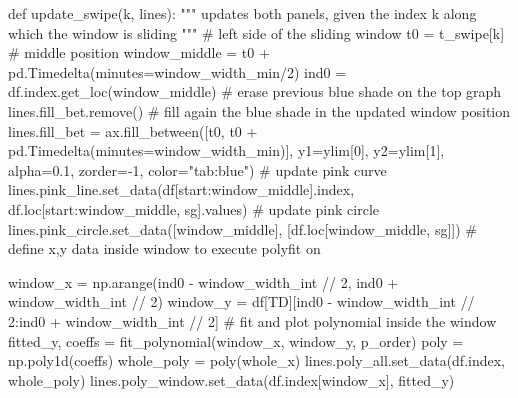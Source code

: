 \documentclass[
  letterpaper,
  DIV=11,
  numbers=noendperiod,
  oneside]{scrreprt}
\newenvironment{Shaded}{\begin{snugshade}}{\end{snugshade}}
\newcommand{\CommentTok}[1]{\textcolor[rgb]{0.37,0.37,0.37}{#1}}
\newcommand{\DecValTok}[1]{\textcolor[rgb]{0.68,0.00,0.00}{#1}}
\newcommand{\FloatTok}[1]{\textcolor[rgb]{0.68,0.00,0.00}{#1}}
\newcommand{\KeywordTok}[1]{\textcolor[rgb]{0.00,0.23,0.31}{#1}}
\newcommand{\NormalTok}[1]{\textcolor[rgb]{0.00,0.23,0.31}{#1}}
\newcommand{\OperatorTok}[1]{\textcolor[rgb]{0.37,0.37,0.37}{#1}}
\newcommand{\StringTok}[1]{\textcolor[rgb]{0.13,0.47,0.30}{#1}}
\begin{document}
\begin{Shaded}
\begin{Highlighting}[]
\KeywordTok{def}\NormalTok{ update\_swipe(k, lines):}
    \CommentTok{"""}
\CommentTok{    updates both panels, given the index k along which the window is sliding}
\CommentTok{    """}
    \CommentTok{\# left side of the sliding window}
\NormalTok{    t0 }\OperatorTok{=}\NormalTok{ t\_swipe[k]}
    \CommentTok{\# middle position}
\NormalTok{    window\_middle }\OperatorTok{=}\NormalTok{ t0 }\OperatorTok{+}\NormalTok{ pd.Timedelta(minutes}\OperatorTok{=}\NormalTok{window\_width\_min}\OperatorTok{/}\DecValTok{2}\NormalTok{)}
\NormalTok{    ind0 }\OperatorTok{=}\NormalTok{ df.index.get\_loc(window\_middle)}
    \CommentTok{\# erase previous blue shade on the top graph}
\NormalTok{    lines.fill\_bet.remove()}
    \CommentTok{\# fill again the blue shade in the updated window position}
\NormalTok{    lines.fill\_bet }\OperatorTok{=}\NormalTok{ ax.fill\_between([t0, t0 }\OperatorTok{+}\NormalTok{ pd.Timedelta(minutes}\OperatorTok{=}\NormalTok{window\_width\_min)],}
\NormalTok{                                               y1}\OperatorTok{=}\NormalTok{ylim[}\DecValTok{0}\NormalTok{], y2}\OperatorTok{=}\NormalTok{ylim[}\DecValTok{1}\NormalTok{], alpha}\OperatorTok{=}\FloatTok{0.1}\NormalTok{, zorder}\OperatorTok{={-}}\DecValTok{1}\NormalTok{, color}\OperatorTok{=}\StringTok{"tab:blue"}\NormalTok{)}
    \CommentTok{\# update pink curve}
\NormalTok{    lines.pink\_line.set\_data(df[start:window\_middle].index,}
\NormalTok{                             df.loc[start:window\_middle, }\StringTok{\textquotesingle{}sg\textquotesingle{}}\NormalTok{].values)}
    \CommentTok{\# update pink circle}
\NormalTok{    lines.pink\_circle.set\_data([window\_middle], [df.loc[window\_middle, }\StringTok{\textquotesingle{}sg\textquotesingle{}}\NormalTok{]])}
    \CommentTok{\# define x,y data inside window to execute polyfit on}
    
\NormalTok{    window\_x }\OperatorTok{=}\NormalTok{ np.arange(ind0 }\OperatorTok{{-}}\NormalTok{ window\_width\_int }\OperatorTok{//} \DecValTok{2}\NormalTok{, ind0 }\OperatorTok{+}\NormalTok{ window\_width\_int }\OperatorTok{//} \DecValTok{2}\NormalTok{)}
\NormalTok{    window\_y }\OperatorTok{=}\NormalTok{ df[}\StringTok{\textquotesingle{}TD\textquotesingle{}}\NormalTok{][ind0 }\OperatorTok{{-}}\NormalTok{ window\_width\_int }\OperatorTok{//} \DecValTok{2}\NormalTok{:ind0 }\OperatorTok{+}\NormalTok{ window\_width\_int }\OperatorTok{//} \DecValTok{2}\NormalTok{]}
    \CommentTok{\# fit and plot polynomial inside the window}
\NormalTok{    fitted\_y, coeffs }\OperatorTok{=}\NormalTok{ fit\_polynomial(window\_x, window\_y, p\_order)}
\NormalTok{    poly }\OperatorTok{=}\NormalTok{ np.poly1d(coeffs)}
\NormalTok{    whole\_poly }\OperatorTok{=}\NormalTok{ poly(whole\_x)}
\NormalTok{    lines.poly\_all.set\_data(df.index, whole\_poly)}
\NormalTok{    lines.poly\_window.set\_data(df.index[window\_x], fitted\_y)}


\end{Highlighting}
\end{Shaded}
\end{document}
